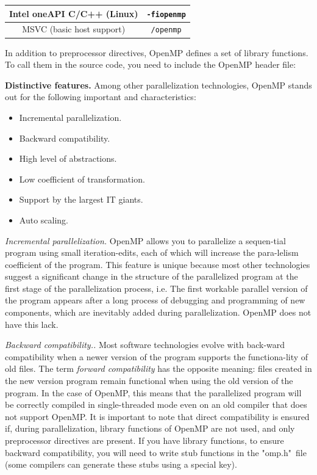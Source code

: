 {\begin{table}[H]
\begin{center}
\begin{tabular}{|c|c|}
				\hline
				Intel oneAPI C/C++ (Linux) & \texttt{-fiopenmp} \\
				\hline
				MSVC (basic host support) & \texttt{/openmp} \\
				\hline
			\end{tabular}
		\end{center}
	\end{table}
	\par In addition to preprocessor directives, OpenMP defines a set of library functions. To call them in the source code, you need to include the OpenMP header file:
	\begin{figure}[H]
		
	\end{figure}
	\par\textbf{Distinctive features.} Among other parallelization technologies, OpenMP stands out for the following important and characteristics:
	\begin{itemize}
		\item Incremental parallelization.
		\item Backward compatibility.
		\item High level of abstractions.
		\item Low coefficient of transformation.
		\item Support by the largest IT giants.
		\item Auto scaling.
	\end{itemize}
	\par\textit{Incremental parallelization.} OpenMP allows you to parallelize a sequen-tial program using small iteration-edits, each of which will increase the para-lelism coefficient of the program. This feature is unique because most other technologies suggest a significant change in the structure of the parallelized program at the first stage of the parallelization process, i.e. The first workable parallel version of the program appears after a long process of debugging and programming of new components, which are inevitably added during parallelization. OpenMP does not have this lack.
	\par\textit{Backward compatibility..} Most software technologies evolve with back-ward compatibility when a newer version of the program supports the functiona-lity of old files. The term \textit{forward compatibility} has the opposite meaning: files created in the new version program remain functional when using the old version of the program. In the case of OpenMP, this means that the parallelized program will be correctly compiled in single-threaded mode even on an old compiler that does not support OpenMP. It is important to note that direct compatibility is ensured if, during parallelization, library functions of OpenMP are not used, and only preprocessor directives are present. If you have library functions, to ensure backward compatibility, you will need to write stub functions in the "omp.h"\ file (some compilers can generate these stubs using a special key).
}
